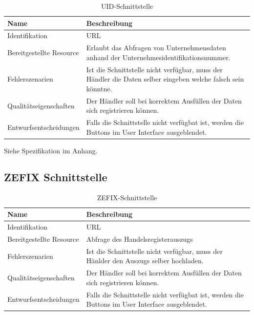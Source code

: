 \begin{table}[H]
	\centering
	\caption{UID-Schnittstelle}
	\begin{tabular}{ | p{4cm} | p{11cm} | }
		\toprule
		{\textbf{Name}} & {\textbf{Beschreibung}} \\
		\midrule
		Identifikation & URL\\ \hline
		Bereitgestellte Resource & Erlaubt das Abfragen von Unternehmensdaten anhand der Unternehmesidentifikationsnummer. \\ \hline
		Fehlerszenarien & Ist die Schnittstelle nicht verfügbar, muss der Händler die Daten selber eingeben welche falsch sein könntne.\\ \hline
		Qualitätseigenschaften & Der Händler soll bei korrektem Ausfüllen der Daten sich registrieren können.\\ \hline
		Entwurfsentscheidungen & Falls die Schnittstelle nicht verfügbat ist, werden die Buttons im User Interface ausgeblendet.\\
		\bottomrule
	\end{tabular}
\end{table}

Siehe Spezifikation im Anhang.

\subsection{ZEFIX Schnittstelle}

\begin{table}[H]
	\centering
	\caption{ZEFIX-Schnittstelle}
	\begin{tabular}{  | p{4cm} | p{11cm} | }
		\toprule
		{\textbf{Name}} & {\textbf{Beschreibung}} \\
		\midrule
		Identifikation & URL\\ \hline
		Bereitgestellte Resource & Abfrage des Handelsregisterauszugs \\ \hline
		Fehlerszenarien & Ist die Schnittstelle nicht verfügbar, muss der Hänlder den Auszugs selber hochladen.\\ \hline
		Qualitätseigenschaften & Der Händler soll bei korrektem Ausfüllen der Daten sich registrieren können.\\ \hline
		Entwurfsentscheidungen & Falls die Schnittstelle nicht verfügbat ist, werden die Buttons im User Interface ausgeblendet.\\
		\bottomrule
	\end{tabular}
\end{table}

